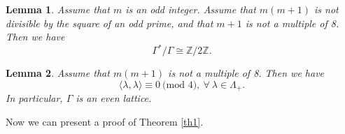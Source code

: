 \documentclass[11pt]{article}
\newtheorem{lemma}{Lemma}[section]
\theoremstyle{definition}
\theoremstyle{remark}
\begin{document}
\begin{lemma}{\rm{\cite[Lemma 4.5]{NV13}}}\label{lemma1}
Assume that $m$ is an odd integer. Assume that $m(m+1)$ is not divisible by the square of an odd prime, and that $m+1$ is not a multiple of 8.  Then we have 
\begin{equation*}
\Gamma^*\slash\Gamma\cong\mathbb{Z}\slash2\mathbb{Z}.
\end{equation*}
\end{lemma}


\begin{lemma}{\rm{\cite[Lemma 3.7]{BMV04}}}\label{lemma2}
Assume that $m(m+1)$ is not a multiple of 8.  Then we have 
\begin{equation*}
\langle \lambda,\lambda\rangle\equiv0\ \text{(mod 4)}, \ \forall \ \lambda\in \Lambda_+.
\end{equation*}
In particular, $\Gamma$ is an even lattice.
\end{lemma}

Now we can present a proof of Theorem \ref{th1}.
\end{document}
